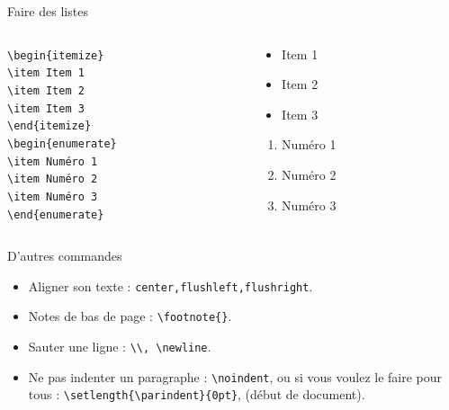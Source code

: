 \documentclass[handout]{beamer}
\begin{document}
\begin{frame}{Faire des listes}
\begin{columns}
	\begin{column}{0.5\textwidth}
		\texttt{\textbackslash begin\{itemize\}}\\
		\texttt{\textbackslash item Item 1}\\
		\texttt{\textbackslash item Item 2}\\
		\texttt{\textbackslash item Item 3}\\
		\texttt{\textbackslash end\{itemize\}}\\[11pt]
		
		\texttt{\textbackslash begin\{enumerate\}}\\
		\texttt{\textbackslash item Numéro 1}\\
		\texttt{\textbackslash item Numéro 2}\\
		\texttt{\textbackslash item Numéro 3}\\
		\texttt{\textbackslash end\{enumerate\}}
	\end{column}
	\begin{column}{0.5\textwidth}
		\begin{itemize}
			\item Item 1
			\item Item 2
			\item Item 3\\[1cm]
		\end{itemize}
		
		\begin{enumerate}
			\item Numéro 1
			\item Numéro 2
			\item Numéro 3
		\end{enumerate}
	\end{column}
\end{columns}
\end{frame}
\begin{frame}{D'autres commandes}
\begin{itemize}
	\item Aligner son texte : \texttt{center,flushleft,flushright}.\\[11pt]
	\item Notes de bas de page : \texttt{\textbackslash footnote\{\}}.\\[11pt]
	\item Sauter une ligne : \texttt{\textbackslash \textbackslash, \textbackslash newline}.\\[11pt]
	\item Ne pas indenter un paragraphe : \texttt{\textbackslash noindent}, ou si vous voulez le faire pour tous : \texttt{\textbackslash setlength\{\textbackslash parindent\}\{0pt\}}, (début de document).
\end{itemize}
\end{frame}
\end{document}
